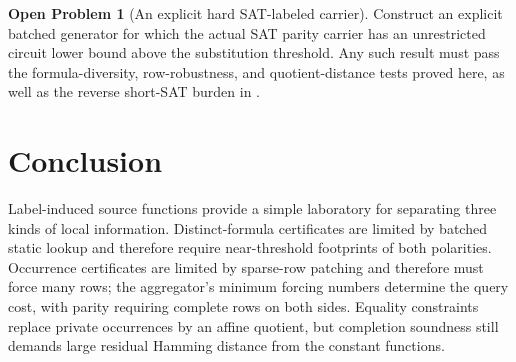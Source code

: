 \documentclass[11pt]{article}
\theoremstyle{definition}
\newtheorem{openproblem}[theorem]{Open Problem}
\begin{document}
\begin{openproblem}[An explicit hard SAT-labeled carrier]\label{op:source}
Construct an explicit batched generator for which the actual SAT parity carrier has an unrestricted circuit lower bound above the substitution threshold.  Any such result must pass the formula-diversity, row-robustness, and quotient-distance tests proved here, as well as the reverse short-SAT burden in .
\end{openproblem}

\section{Conclusion}

Label-induced source functions provide a simple laboratory for separating three kinds of local information.  Distinct-formula certificates are limited by batched static lookup and therefore require near-threshold footprints of both polarities.  Occurrence certificates are limited by sparse-row patching and therefore must force many rows; the aggregator's minimum forcing numbers determine the query cost, with parity requiring complete rows on both sides.  Equality constraints replace private occurrences by an affine quotient, but completion soundness still demands large residual Hamming distance from the constant functions.
\end{document}

